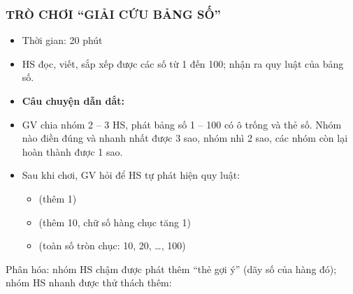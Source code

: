 \documentclass[../main.tex]{subfiles}
\begin{document}
\subsubsection{TRÒ CHƠI “GIẢI CỨU BẢNG SỐ”}
\begin{hd}
    \begin{itemize}
        \item Thời gian: 20 phút
        \item HS đọc, viết, sắp xếp được các số từ 1 đến 100; nhận ra quy luật của bảng số.
    \end{itemize}
\end{hd}
\begin{itemize}
    \item \textbf{Câu chuyện dẫn dắt:} 
    \item GV chia nhóm 2 -- 3 HS, phát bảng số 1 -- 100 có ô trống và thẻ số. Nhóm nào điền đúng và nhanh nhất được 3 sao, nhóm nhì 2 sao, các nhóm còn lại hoàn thành được 1 sao.
    \item Sau khi chơi, GV hỏi để HS tự phát hiện quy luật:
    \begin{itemize}
        \item[--]  (thêm 1)
        \item[--]  (thêm 10, chữ số hàng chục tăng 1)
        \item[--]  (toàn số tròn chục: 10, 20, \dots, 100)
    \end{itemize}
\end{itemize}
\begin{center}
\end{center}
\begin{luuy}
    Phân hóa: nhóm HS chậm được phát thêm “thẻ gợi ý” (dãy số của hàng đó); nhóm HS nhanh được thử thách thêm: 
\end{luuy}
\end{document}
